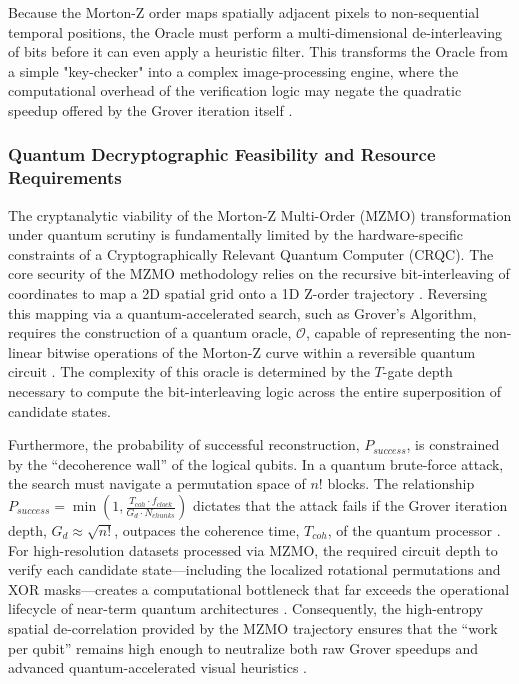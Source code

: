 \documentclass[12pt,fleqn]{article}
\begin{document}
Because the Morton-Z order maps spatially adjacent pixels to non-sequential temporal positions, the Oracle must perform a multi-dimensional de-interleaving of bits before it can even apply a heuristic filter. This transforms the Oracle from a simple "key-checker" into a complex image-processing engine, where the computational overhead of the verification logic may negate the quadratic speedup offered by the Grover iteration itself \cite{brassard2002quantum}.

\subsubsection{Quantum Decryptographic Feasibility and Resource Requirements}

The cryptanalytic viability of the Morton-Z Multi-Order (MZMO) transformation under quantum scrutiny is fundamentally limited by the hardware-specific constraints of a Cryptographically Relevant Quantum Computer (CRQC). The core security of the MZMO methodology relies on the recursive bit-interleaving of coordinates to map a 2D spatial grid onto a 1D Z-order trajectory \cite{morton1966computer}. Reversing this mapping via a quantum-accelerated search, such as Grover's Algorithm, requires the construction of a quantum oracle, $\mathcal{O}$, capable of representing the non-linear bitwise operations of the Morton-Z curve within a reversible quantum circuit \cite{nielsen2010quantum}. The complexity of this oracle is determined by the $T$-gate depth necessary to compute the bit-interleaving logic across the entire superposition of candidate states. 

Furthermore, the probability of successful reconstruction, $P_{success}$, is constrained by the ``decoherence wall'' of the logical qubits. In a quantum brute-force attack, the search must navigate a permutation space of $n!$ blocks. The relationship $P_{success} = \min(1, \frac{T_{coh} \cdot f_{clock}}{G_d \cdot N_{chunks}})$ dictates that the attack fails if the Grover iteration depth, $G_d \approx \sqrt{n!}$, outpaces the coherence time, $T_{coh}$, of the quantum processor \cite{bennett1997strengths}. For high-resolution datasets processed via MZMO, the required circuit depth to verify each candidate state---including the localized rotational permutations and XOR masks---creates a computational bottleneck that far exceeds the operational lifecycle of near-term quantum architectures \cite{montanaro2016quantum}. Consequently, the high-entropy spatial de-correlation provided by the MZMO trajectory ensures that the ``work per qubit'' remains high enough to neutralize both raw Grover speedups and advanced quantum-accelerated visual heuristics \cite{brassard2002quantum}.
\end{document}

